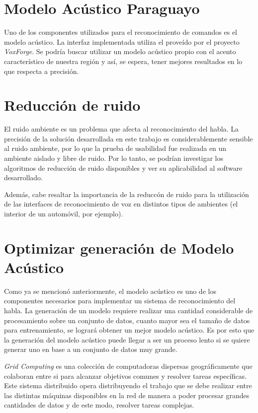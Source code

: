 \section{Modelo Ac\'ustico Paraguayo}  

Uno de los componentes utilizados para el reconocimiento de comandos es el modelo ac\'ustico. La interfaz implementada
utiliza el prove\'ido por el proyecto \emph{VoxForge}. Se podr\'ia buscar utilizar un modelo ac\'ustico propio con el
acento caracter\'istico de nuestra regi\'on y as\'i, se espera, tener mejores resultados en lo que respecta a precisi\'on.

\section{Reducci\'on de ruido}

El ruido ambiente es un problema que afecta al reconocimiento del habla. La precisi\'on de la
soluci\'on desarrollada en este trabajo es considerablemente sensible al ruido ambiente, por lo que 
la prueba de usabilidad fue realizada en un ambiente aislado y libre de ruido. 
Por lo tanto, se podr\'ian investigar los algoritmos de reducci\'on de ruido disponibles y ver su aplicabilidad
al software desarrollado. 

Adem\'as, cabe resaltar la importancia de la reducc\'on de ruido para la utilizaci\'on de
las interfaces de reconocimiento de voz en distintos tipos de ambientes (el interior de un autom\'ovil, por ejemplo).

\section{Optimizar generaci\'on de Modelo Ac\'ustico}

Como ya se mencion\'o anteriormente, el modelo ac\'ustico es uno de los componentes necesarios para implementar un sistema de 
reconocimiento del habla. La generación de un modelo requiere realizar una cantidad considerable de procesamiento sobre
un conjunto de datos, cuanto mayor sea el tama\~no de datos para entrenamiento, se lograr\'a obtener un mejor modelo ac\'ustico. Es por
esto que la generaci\'on del modelo ac\'ustico puede llegar a ser un proceso lento si se quiere generar uno en base a un conjunto de datos
muy grande.

\emph{Grid Computing} es una colecci\'on de computadoras dispersas geogr\'aficamente que colaboran entre si para alcanzar objetivos comunes y resolver
tareas espec\'ificas. Este sistema distribuido opera distribuyendo el trabajo que se debe realizar entre las distintas m\'aquinas disponibles en la red
de manera a poder procesar grandes cantidades de datos y de este modo, resolver tareas complejas.

